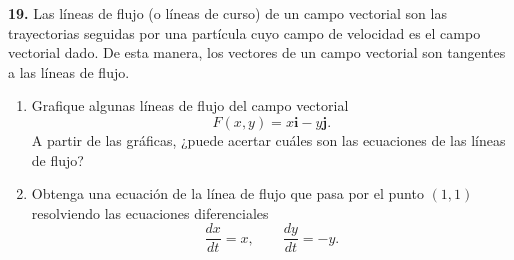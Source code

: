\textbf{19.} Las líneas de flujo (o líneas de curso) de un campo vectorial son las trayectorias seguidas por una partícula cuyo campo de velocidad es el campo vectorial dado. De esta manera, los vectores de un campo vectorial son tangentes a las líneas de flujo.
\begin{enumerate}
    \item[(a)] Grafique algunas líneas de flujo del campo vectorial
    \[
    F(x,y)=x\mathbf{i}-y\mathbf{j}.
    \]
    A partir de las gráficas, ¿puede acertar cuáles son las ecuaciones de las líneas de flujo?
    
    \item[(b)] Obtenga una ecuación de la línea de flujo que pasa por el punto $(1,1)$ resolviendo las ecuaciones diferenciales
    \[
    \frac{dx}{dt}=x,
    \qquad
    \frac{dy}{dt}=-y.
    \]
\end{enumerate}
